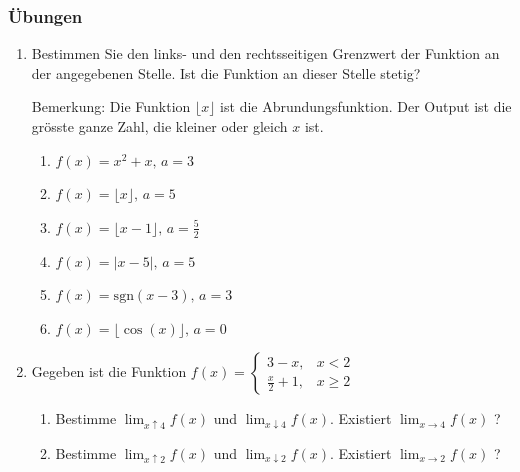 \subsubsection{Übungen}
\begin{enumerate}
    \item Bestimmen Sie den links- und den rechtsseitigen Grenzwert der Funktion an der angegebenen Stelle. Ist die Funktion an dieser Stelle stetig?

          Bemerkung: Die Funktion $\lfloor x \rfloor$ ist die Abrundungsfunktion. Der Output ist die grösste ganze Zahl, die kleiner oder gleich $x$ ist.
          \begin{enumerate}
              \item $f(x)=x^2+x, \, a=3$
              \item  $f(x)=\lfloor x \rfloor, \, a=5$
              \item  $f(x)=\lfloor x-1 \rfloor, \, a=\frac{5}{2}$
              \item  $f(x)=\lvert x-5 \rvert, \, a=5$
              \item  $f(x)=\mathrm{sgn}(x-3), \, a=3$
              \item  $f(x)=\lfloor \cos(x)\rfloor, \, a=0$
          \end{enumerate}
    \item Gegeben ist die Funktion $f(x) = \left\{\begin{array}{ll}
                  3-x, & x<2 \\\frac{x}{2}+1, &x\ge 2
              \end{array}\right.$
          \begin{enumerate}
              \item Bestimme $\lim_{x\uparrow 4} f(x)$ und $\lim_{x\downarrow 4} f(x)$. Existiert $\lim_{x\to 4} f(x)$  ?
              \item Bestimme $\lim_{x\uparrow 2} f(x)$ und $\lim_{x\downarrow 2} f(x)$. Existiert $\lim_{x\to 2} f(x)$  ?
          \end{enumerate}
\end{enumerate}
\clearpage
